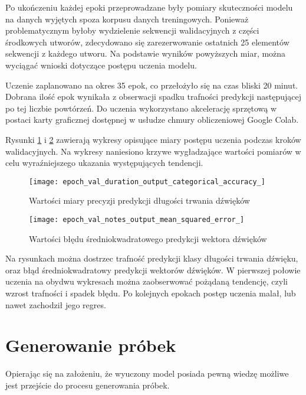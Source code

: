 {{        Po ukończeniu każdej epoki przeprowadzane były pomiary skuteczności modelu na danych wyjętych spoza korpusu 
        danych treningowych. Ponieważ problematycznym byłoby wydzielenie sekwencji walidacyjnych z\,\,części środkowych
        utworów, zdecydowano się zarezerwowanie ostatnich 25 elementów sekwencji z\,\,każdego utworu.
        Na podstawie wyników powyższych miar, można wyciągać wnioski dotyczące postępu uczenia modelu.

        Uczenie zaplanowano na okres 35 epok, co przełożyło się na czas bliski 20 minut. Dobrana ilość epok wynikała 
        z\,\,obserwacji spadku trafności predykcji następującej po tej liczbie powtórzeń. Do uczenia wykorzystano
        akcelerację sprzętową w\,\,postaci karty graficznej dostępnej w\,\,usłudze chmury obliczeniowej Google Colab.

        Rysunki \ref{epoch_val_duration_output_categorical_accuracy_} i\,\,\ref{epoch_val_notes_output_mean_squared_error_} zawierają wykresy opisujące miary postępu uczenia podczas kroków walidacyjnych. Na wykresy naniesiono krzywe wygładzające wartości pomiarów w celu wyraźniejszego ukazania występujących tendencji.

        \begin{figure}[H]
            \centering
            \texttt{[image: epoch\_val\_duration\_output\_categorical\_accuracy\_]}
            \caption{Wartości miary precyzji predykcji długości trwania dźwięków}
            \label{epoch_val_duration_output_categorical_accuracy_}
        \end{figure}

        \begin{figure}[H]
            \centering
            \texttt{[image: epoch\_val\_notes\_output\_mean\_squared\_error\_]}
            \caption{Wartości błędu średniokwadratowego predykcji wektora dźwięków}
            \label{epoch_val_notes_output_mean_squared_error_}
        \end{figure}

        Na rysunkach można dostrzec trafność predykcji klasy długości trwania dźwięku, oraz błąd średniokwadratowy
        predykcji wektorów dźwięków. W\,\,pierwszej połowie uczenia na obydwu wykresach można zaobserwować pożądaną tendencję,
        czyli wzrost trafności i\,\,spadek błędu. Po kolejnych epokach postęp uczenia malał, lub nawet zachodził jego regres.
    }

    \section{Generowanie próbek}
    {
        Opierając się na założeniu, że wyuczony model posiada pewną wiedzę możliwe jest przejście do procesu generowania próbek.

}}
